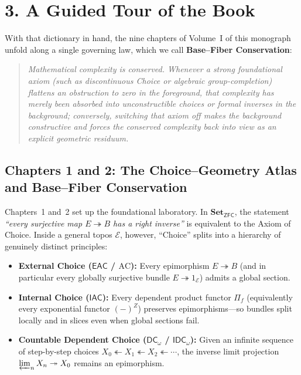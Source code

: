 \documentclass[10pt,twoside,openright]{book}
\theoremstyle{crmplain}
\theoremstyle{crmdef}
\theoremstyle{crmremark}
\begin{document}
\section*{3. A Guided Tour of the Book}

With that dictionary in hand, the nine chapters of Volume~I of this monograph unfold along a single governing law, which we call \textbf{Base--Fiber Conservation}:

\begin{quote}
\emph{Mathematical complexity is conserved. Whenever a strong foundational axiom (such as discontinuous Choice or algebraic group-completion) flattens an obstruction to zero in the foreground, that complexity has merely been absorbed into unconstructible choices or formal inverses in the background; conversely, switching that axiom off makes the background constructive and forces the conserved complexity back into view as an explicit geometric residuum.}
\end{quote}

\subsection*{Chapters 1 and 2: The Choice--Geometry Atlas and Base--Fiber Conservation}

Chapters~1 and~2 set up the foundational laboratory. In $\mathbf{Set}_{\mathsf{ZFC}}$, the statement \emph{``every surjective map $E \twoheadrightarrow B$ has a right inverse''} is equivalent to the Axiom of Choice. Inside a general topos $\mathcal{E}$, however, ``Choice'' splits into a hierarchy of genuinely distinct principles:
\begin{itemize}
  \item \textbf{External Choice ($\mathsf{EAC}$ / $\mathrm{AC}$):} Every epimorphism $E \twoheadrightarrow B$ (and in particular every globally surjective bundle $E \twoheadrightarrow 1_{\mathcal{E}}$) admits a global section.
  \item \textbf{Internal Choice ($\mathsf{IAC}$):} Every dependent product functor $\Pi_f$ (equivalently every exponential functor $(-)^Z$) preserves epimorphisms---so bundles split locally and in slices even when global sections fail.
  \item \textbf{Countable Dependent Choice ($\mathsf{DC}_\omega$ / $\mathsf{IDC}_\omega$):} Given an infinite sequence of step-by-step choices $X_0 \twoheadleftarrow X_1 \twoheadleftarrow X_2 \twoheadleftarrow \cdots$, the inverse limit projection $\varprojlim_n X_n \twoheadrightarrow X_0$ remains an epimorphism.
\end{itemize}
\end{document}
